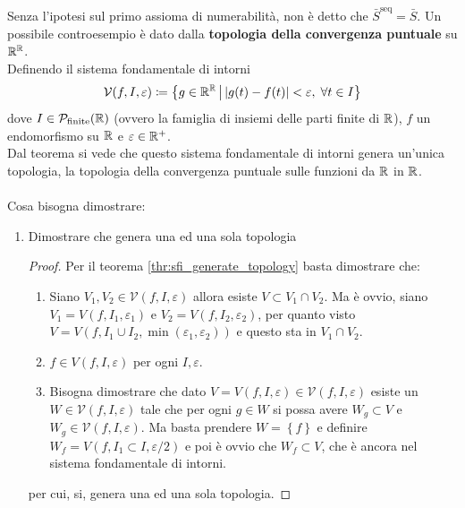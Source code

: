 \begin{remark}
	Senza l'ipotesi sul primo assioma di numerabilità, non è detto che $\bar{S}^\text{seq} = \bar{S}$. Un possibile controesempio è dato dalla \textbf{topologia della convergenza puntuale} su $\mathbb{R}^{\mathbb{R}}$. \\
	Definendo il sistema fondamentale di intorni 
	\begin{equation*}
		\mathcal{V}(f, I, \varepsilon) \coloneqq \left\{ g \in \mathbb{R}^{\mathbb{R}} \,\middle|\,  |g(t) - f(t)| < \varepsilon, \; \forall t \in I \right\}
	\end{equation*}
	dove $I \in \mathcal{P}_\text{finite}(\mathbb{R})$ (ovvero la famiglia di insiemi delle parti finite di $\mathbb{R}$), $f$ un endomorfismo su $\mathbb{R}$ e $\varepsilon \in \mathbb{R}^+$. \\
	Dal teorema si vede che questo sistema fondamentale di intorni genera un'unica topologia, la topologia della convergenza puntuale sulle funzioni da $\mathbb{R}$ in $\mathbb{R}$.
	\\ \\
	Cosa bisogna dimostrare:
	\begin{enumerate}
		\item Dimostrare che genera una ed una sola topologia 
		\begin{proof}
			Per il teorema \ref{thr:sfi_generate_topology} basta dimostrare che:
			\begin{enumerate}
				\item Siano $V_1, V_2 \in \mathcal{V}(f,I,\varepsilon)$ allora esiste $V \subset V_1 \cap V_2$. Ma è ovvio, siano $V_1 = V(f, I_1, \varepsilon_1)$ e $V_2 = V(f, I_2, \varepsilon_2)$, per quanto visto $V = V(f, I_1 \cup I_2, \min(\varepsilon_1, \varepsilon_2))$  e questo sta in $V_1 \cap V_2$.
				\item $f \in V(f, I, \varepsilon)$ per ogni $I, \varepsilon$.
				\item Bisogna dimostrare che dato $V = V(f, I, \varepsilon)\in \mathcal{V}(f,I,\varepsilon)$ esiste un $W \in \mathcal{V}(f,I,\varepsilon)$ tale che per ogni $g \in W$ si possa avere $W_g \subset V$ e $W_g \in \mathcal{V}(f,I, \varepsilon)$. Ma basta prendere $W = \left\{f\right\}$ e definire $W_f = V(f, I_1 \subset I, \varepsilon/2)$ e poi è ovvio che $W_f \subset V$, che è ancora nel sistema fondamentale di intorni.
			\end{enumerate}
		per cui, si, genera una ed una sola topologia.

\end{proof}
\end{enumerate}
\end{remark}
